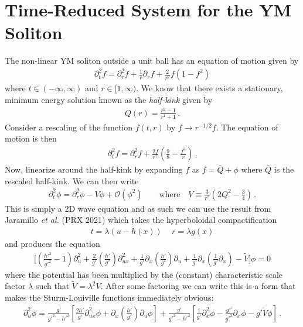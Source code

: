 \documentclass[11pt,letterpaper]{article}
\newcommand{\p}{\partial}
\newcommand{\mc}{\mathcal}
\begin{document}
	

\section{Time-Reduced System for the YM Soliton}
	The non-linear YM soliton outside a unit ball has an equation of motion given by
	\begin{align}
		\p^2_t f = \p^2_r f + \frac{1}{r} \p_r f + \frac{2}{r^2} f (1-f^2)
	\end{align}
where $t\in(-\infty, \infty)$ and $r \in [1,\infty)$. We know that there exists a stationary, minimum energy solution known as the \emph{half-kink} given by
	\begin{align}
		Q(r) = \frac{r^2-1}{r^1+1} \, .
	\end{align}
Consider a rescaling of the function $f(t,r)$ by $f \to r^{-1/2} f$. The equation of motion is then
	\begin{align}
		\p^2_t f = \p^2_r f + \frac{2f}{r^2}\left(\frac{9}{8}-\frac{f^2}{r} \right) \, .
	\end{align}
Now, linearize around the half-kink by expanding $f$ as $f = \bar Q + \phi$ where $\bar Q$ is the rescaled half-kink. We can then write
	\begin{align}
		\p^2_t \phi = \p^2_r \phi - V \phi + \mc{O}(\phi^2) \qquad \text{where} \quad V \equiv \frac{3}{r^2}\left(2 Q^2 - \frac{3}{4} \right) \, .
	\end{align}
This is simply a 2D wave equation and as such we can use the result from Jaramillo {\it et al.} (PRX 2021) which takes the hyperboloidal compactification
	\begin{align}
		\label{coordinates}
		t = \lambda (u - h(x)) \, \quad r = \lambda g(x)
	\end{align}
and produces the equation
	\begin{align}
		\Big[\left(\frac{h'^2}{g'^2} - 1 \right) \p^2_u + \frac{2}{g'}\left(\frac{h'}{g'} \right) \p^2_{u x} + \frac{1}{g'}\p_x \left(\frac{h'}{g'} \right) \p_u + \frac{1}{g'}\p_x \left(\frac{1}{g'} \p_x \right) - \tilde{V} \Big] \phi = 0
	\end{align}
where the potential has been multiplied by the (constant) characteristic scale factor $\lambda$ such that $\tilde{V} = \lambda^2 V$. After some factoring we can write this is a form that makes the Sturm-Louiville functions immediately obvious:
	\begin{align}
		\p^2_u \phi = \frac{g'}{g'^2-h'^2}\left[\frac{2 h'}{g'}\p^2_{u x}\phi + \p_x \left( \frac{h'}{g'} \right) \p_u \phi  \right] + \frac{g'}{g'^2-h'^2}\left[\frac{1}{g'}\p^2_x \phi - \frac{g''}{g'^2} \p_x \phi - g' \tilde V \phi \right] \, .
	\end{align}
\end{document}
